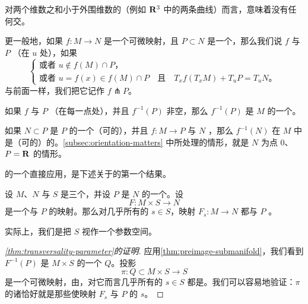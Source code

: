 \begin{remark}\label{thm:transversality-no-intersection}
对两个维数之和小于外围\trManifold{}维数的\trSubmanifold（例如 $\mathbf{R}^{3}$ 中的两条曲线）而言，\trTransversality{}意味着没有任何交。
\end{remark}

更一般地，如果 $f:M\to N$ 是一个可微映射，且 $P\subset N$ 是一个\trSubmanifold，那么我们说 $f$ 与 $P$ \trTransverse（在 $u$ 处），如果
\[
\begin{cases}
\text{或者 }u\notin f(M)\cap P\text{，}\\
\text{或者 }u=f(x)\in f(M)\cap P\quad\text{且}\quad T_{x}f(T_{x}M)+T_{u}P=T_{u}N\text{。}
\end{cases}
\]
与前面一样，我们把它记作 $f\pitchfork P$。

\begin{proposition}\label{thm:preimage-submanifold}
如果 $f$ 与 $P$ \trTransverse（在每一点处），并且 $f^{-1}(P)$ 非空，那么 $f^{-1}(P)$ 是 $M$ 的一个\trSubmanifold。
\end{proposition}
\noqed

\begin{remark}\label{thm:preimage-orientable}
如果 $N\subset P$ 是\trOrientable\trManifold{} $P$ 的一个（可\trCoorientation{}的）\trOrientable\trSubmanifold，并且 $f:M\to P$ 与 $N$ \trTransverse，那么 $f^{-1}(N)$ 在\trOrientable\trManifold{} $M$ 中是（可\trCoorientation{}的）\trOrientable{}的。\cref{subsec:orientation-matters} 中所处理的情形，就是\trSubmanifold{} $N$ 为点 $0$、$P=\mathbf{R}$ 的情形。
\end{remark}

\trSardTheorem{}的一个直接应用，是下述关于\trTransversality{}的第一个结果。

\begin{theorem}\label{thm:transversality-parameter}
设 $M$、$N$ 与 $S$ 是三个\trManifold，并设 $P$ 是 $N$ 的一个\trSubmanifold。设
\[
F:M\times S\longrightarrow N
\]
是一个与 $P$ \trTransverse{}的映射。那么对几乎所有的 $s\in S$，映射 $F_{s}:M\to N$ 都与 $P$ \trTransverse。
\end{theorem}

实际上，我们是把\trManifold{} $S$ 视作一个参数空间。

\begin{proof}[\cref{thm:transversality-parameter}的证明]
应用\cref{thm:preimage-submanifold}，我们看到 $F^{-1}(P)$ 是 $M\times S$ 的一个\trSubmanifold{} $Q$。投影
\[
\pi:Q\subset M\times S\longrightarrow S
\]
是一个可微映射，由\trSardTheorem，对它而言几乎所有的 $s\in S$ 都是\trRegularValue。我们可以容易地验证：$\pi$ 的诸\trRegularValue{}恰好就是那些使映射 $F_{s}$ 与 $P$ \trTransverse{}的 $s$。
\end{proof}

